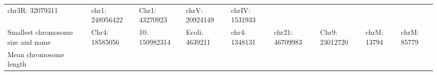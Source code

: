 \documentclass[]{article}
\begin{document}
\begin{longtable}[]{@{}lllllllll@{}}
\begin{minipage}[t]{0.08\columnwidth}
chr3R: 32079311\strut
\end{minipage} & \begin{minipage}[t]{0.08\columnwidth}\raggedright\strut
chr1: 248956422\strut
\end{minipage} & \begin{minipage}[t]{0.07\columnwidth}\raggedright\strut
Chr1: 43270923\strut
\end{minipage} & \begin{minipage}[t]{0.07\columnwidth}\raggedright\strut
chrV: 20924149\strut
\end{minipage} & \begin{minipage}[t]{0.07\columnwidth}\raggedright\strut
chrIV: 1531933\strut
\end{minipage}\tabularnewline
\begin{minipage}[t]{0.16\columnwidth}\raggedright\strut
Smallest chromosome size and name\strut
\end{minipage} & \begin{minipage}[t]{0.07\columnwidth}\raggedright\strut
Chr4: 18585056\strut
\end{minipage} & \begin{minipage}[t]{0.07\columnwidth}\raggedright\strut
10: 150982314\strut
\end{minipage} & \begin{minipage}[t]{0.07\columnwidth}\raggedright\strut
Ecoli: 4639211\strut
\end{minipage} & \begin{minipage}[t]{0.08\columnwidth}\raggedright\strut
chr4: 1348131\strut
\end{minipage} & \begin{minipage}[t]{0.08\columnwidth}\raggedright\strut
chr21: 46709983\strut
\end{minipage} & \begin{minipage}[t]{0.07\columnwidth}\raggedright\strut
Chr9: 23012720\strut
\end{minipage} & \begin{minipage}[t]{0.07\columnwidth}\raggedright\strut
chrM: 13794\strut
\end{minipage} & \begin{minipage}[t]{0.07\columnwidth}\raggedright\strut
chrM: 85779\strut
\end{minipage}\tabularnewline
\begin{minipage}[t]{0.16\columnwidth}\raggedright\strut
Mean chromosome length\strut
\end{minipage} & \begin{minipage}[t]{0.07\columnwidth}\raggedright\strut

\end{minipage}
\end{longtable}
\end{document}

